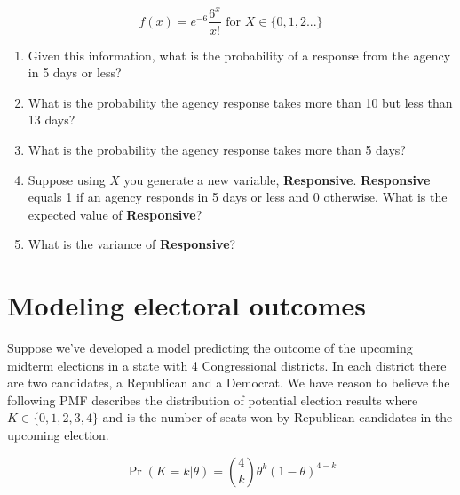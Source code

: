 \documentclass[
]{article}
\begin{document}
\[f(x) = e^{-6} \dfrac{6^x}{x!} \mbox{ for } X \in \{0,1,2...\}\]

\begin{enumerate}
\def\labelenumi{\alph{enumi}.}
\item
  Given this information, what is the probability of a response from the
  agency in 5 days or less?

  \hfill\break
  \hfill\break
  \hfill\break
  \hfill\break
  \hfill\break
  \hfill\break
  \hfill\break
\item
  What is the probability the agency response takes more than 10 but
  less than 13 days?

  \hfill\break
  \hfill\break
  \hfill\break
  \hfill\break
  \hfill\break
  \hfill\break
  \hfill\break
\item
  What is the probability the agency response takes more than 5 days?

  \hfill\break
  \hfill\break
  \hfill\break
  \hfill\break
  \hfill\break
  \hfill\break
  \hfill\break
\item
  Suppose using \(X\) you generate a new variable, \textbf{Responsive}.
  \textbf{Responsive} equals 1 if an agency responds in 5 days or less
  and 0 otherwise. What is the expected value of \textbf{Responsive}?

  \hfill\break
  \hfill\break
  \hfill\break
  \hfill\break
  \hfill\break
  \hfill\break
  \hfill\break
\item
  What is the variance of \textbf{Responsive}?

  \hfill\break
  \hfill\break
  \hfill\break
  \hfill\break
  \hfill\break
  \hfill\break
  \hfill\break
\end{enumerate}

\section{Modeling electoral outcomes}\label{modeling-electoral-outcomes}

Suppose we've developed a model predicting the outcome of the upcoming
midterm elections in a state with 4 Congressional districts. In each
district there are two candidates, a Republican and a Democrat. We have
reason to believe the following PMF describes the distribution of
potential election results where \(K \in \{0,1,2,3,4\}\) and is the
number of seats won by Republican candidates in the upcoming election.

\[
\Pr(K=k | \theta) = \binom{4}{k} \theta^{k} (1-\theta)^{4-k}
\]
\end{document}
